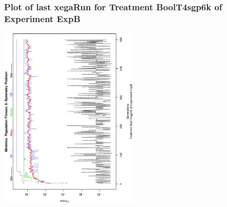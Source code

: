  \begin{frame}
 \frametitle{ Plot of last xegaRun for Treatment BoolT4sgp6k of Experiment ExpB }
 \begin{center}
\includegraphics[width=0.5\textwidth, angle=-90]
{ExpBPlotPopStatsFigure024.eps}
 \end{center}
 \label{report/ExpBPlotPopStatsFigure024.eps}  
 \end{frame}

